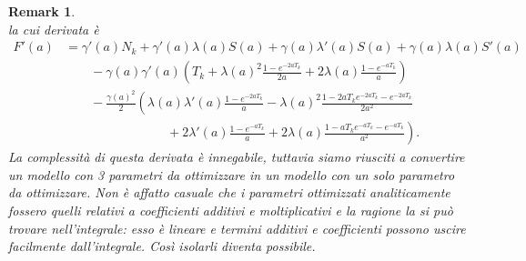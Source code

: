 \documentclass[10pt,a4paper]{report}
\newtheorem{remark}{Remark}
\begin{document}
\begin{remark}
$$$$
la cui derivata è
\begin{align*}
F'(a) &= \gamma'(a)N_k + \gamma'(a)\lambda(a)S(a) + \gamma(a)\lambda'(a)S(a) + \gamma(a)\lambda(a)S'(a) \\
&\qquad- \gamma(a)\gamma'(a)\left(T_k+\lambda(a)^2\frac{1-e^{-2aT_k}}{2a}+2\lambda(a)\frac{1-e^{-aT_k}}{a}\right) \\
&\qquad- \frac{\gamma(a)^2}{2}\left(\lambda(a)\lambda'(a)\frac{1-e^{-2aT_k}}{a}-\lambda(a)^2\frac{1-2aT_ke^{-2aT_k}-e^{-2aT_k}}{2a^2}\right.\\
&\qquad\qquad\qquad\qquad+\left.2\lambda'(a)\frac{1-e^{-aT_k}}{a}+2\lambda(a)\frac{1-aT_ke^{-aT_k}-e^{-aT_k}}{a^2}\right).
\end{align*}
La complessità di questa derivata è innegabile, tuttavia siamo riusciti a convertire un modello con 3 parametri da ottimizzare in un modello con un solo parametro da ottimizzare. Non è affatto casuale che i parametri ottimizzati analiticamente fossero quelli relativi a coefficienti additivi e moltiplicativi e la ragione la si può trovare nell'integrale: esso è lineare e termini additivi e coefficienti possono uscire facilmente dall'integrale. Così isolarli diventa possibile.
\end{remark}
\end{document}
